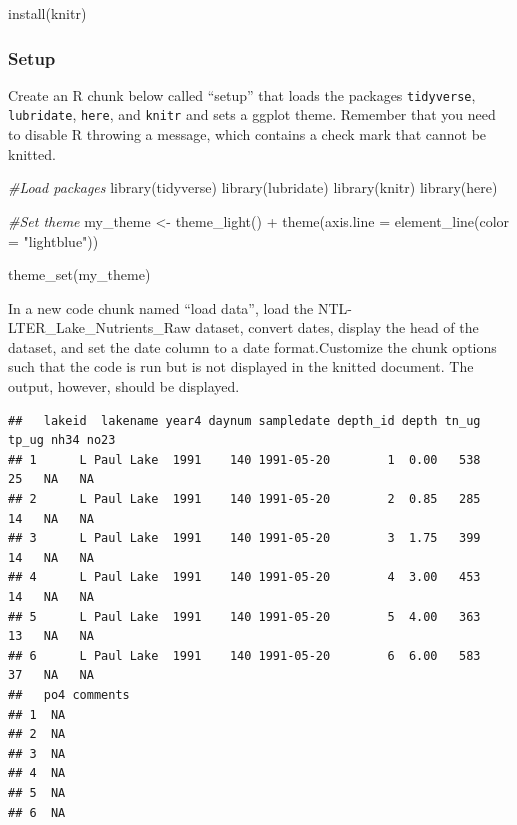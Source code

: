 \documentclass[
]{article}
\newenvironment{Shaded}{\begin{snugshade}}{\end{snugshade}}
\newcommand{\AttributeTok}[1]{\textcolor[rgb]{0.77,0.63,0.00}{#1}}
\newcommand{\CommentTok}[1]{\textcolor[rgb]{0.56,0.35,0.01}{\textit{#1}}}
\newcommand{\FunctionTok}[1]{\textcolor[rgb]{0.00,0.00,0.00}{#1}}
\newcommand{\NormalTok}[1]{#1}
\newcommand{\OtherTok}[1]{\textcolor[rgb]{0.56,0.35,0.01}{#1}}
\newcommand{\SpecialCharTok}[1]{\textcolor[rgb]{0.00,0.00,0.00}{#1}}
\newcommand{\StringTok}[1]{\textcolor[rgb]{0.31,0.60,0.02}{#1}}
\begin{document}
\begin{Shaded}
\begin{Highlighting}[]
\FunctionTok{install}\NormalTok{(}\StringTok{\textquotesingle{}knitr\textquotesingle{}}\NormalTok{)}
\end{Highlighting}
\end{Shaded}

\hypertarget{setup}{%
\subsubsection{Setup}\label{setup}}

Create an R chunk below called ``setup'' that loads the packages
\texttt{tidyverse}, \texttt{lubridate}, \texttt{here}, and
\texttt{knitr} and sets a ggplot theme. Remember that you need to
disable R throwing a message, which contains a check mark that cannot be
knitted.

\begin{Shaded}
\begin{Highlighting}[]
\CommentTok{\#Load packages}
\FunctionTok{library}\NormalTok{(tidyverse)}
\FunctionTok{library}\NormalTok{(lubridate)}
\FunctionTok{library}\NormalTok{(knitr)}
\FunctionTok{library}\NormalTok{(here)}

\CommentTok{\#Set theme}
\NormalTok{my\_theme }\OtherTok{\textless{}{-}} \FunctionTok{theme\_light}\NormalTok{() }\SpecialCharTok{+} 
  \FunctionTok{theme}\NormalTok{(}\AttributeTok{axis.line =} \FunctionTok{element\_line}\NormalTok{(}\AttributeTok{color =} \StringTok{"lightblue"}\NormalTok{))}

\FunctionTok{theme\_set}\NormalTok{(my\_theme)}
\end{Highlighting}
\end{Shaded}

In a new code chunk named ``load data'', load the
NTL-LTER\_Lake\_Nutrients\_Raw dataset, convert dates, display the head
of the dataset, and set the date column to a date format.Customize the
chunk options such that the code is run but is not displayed in the
knitted document. The output, however, should be displayed.

\begin{verbatim}
##   lakeid  lakename year4 daynum sampledate depth_id depth tn_ug tp_ug nh34 no23
## 1      L Paul Lake  1991    140 1991-05-20        1  0.00   538    25   NA   NA
## 2      L Paul Lake  1991    140 1991-05-20        2  0.85   285    14   NA   NA
## 3      L Paul Lake  1991    140 1991-05-20        3  1.75   399    14   NA   NA
## 4      L Paul Lake  1991    140 1991-05-20        4  3.00   453    14   NA   NA
## 5      L Paul Lake  1991    140 1991-05-20        5  4.00   363    13   NA   NA
## 6      L Paul Lake  1991    140 1991-05-20        6  6.00   583    37   NA   NA
##   po4 comments
## 1  NA         
## 2  NA         
## 3  NA         
## 4  NA         
## 5  NA         
## 6  NA
\end{verbatim}
\end{document}
